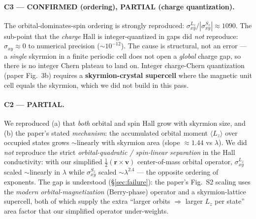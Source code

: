 \documentclass[11pt]{article}
\newcommand{\sigLz}{\sigma^{L_z}_{xy}}
\newcommand{\sigSz}{\sigma^{S_z}_{xy}}
\newcommand{\sigC}{\sigma_{xy}}
\begin{document}
\paragraph{C3 --- CONFIRMED (ordering), PARTIAL (charge quantization).}
The orbital-dominates-spin ordering is strongly reproduced: $\sigLz/|\sigSz|\approx1090$.
The sub-point that the \emph{charge} Hall is integer-quantized in gaps did \emph{not}
reproduce: $\sigC\approx0$ to numerical precision ($\sim\!10^{-12}$). The cause is
structural, not an error --- a \emph{single} skyrmion in a finite periodic cell does not
open a \emph{global} charge gap, so there is no integer Chern plateau to land on. Integer
charge-Chern quantization (paper Fig.~3b) requires a \textbf{skyrmion-crystal supercell}
where the magnetic unit cell equals the skyrmion, which we did not build in this pass.

\paragraph{C2 --- PARTIAL.}
We reproduced (a) that \emph{both} orbital and spin Hall grow with skyrmion size, and (b)
the paper's stated \emph{mechanism}: the accumulated orbital moment $\langle L_z\rangle$
over occupied states grows $\sim$linearly with skyrmion area (slope $\approx1.44$ vs
$\lambda$). We did \emph{not} reproduce the strict \emph{orbital-quadratic /
spin-linear separation} in the Hall conductivity: with our simplified $\tfrac12(\mathbf r
\times \mathbf v)$ center-of-mass orbital operator, $\sigLz$ scaled $\sim$linearly in
$\lambda$ while $\sigSz$ scaled $\sim\!\lambda^{2.4}$ --- the opposite ordering of
exponents. The gap is understood (\S\ref{sec:failure}): the paper's Fig.~S2 scaling uses
the \emph{modern orbital-magnetization} (Berry-phase) operator and a skyrmion-lattice
supercell, both of which supply the extra ``larger orbits $\Rightarrow$ larger $L_z$ per
state'' area factor that our simplified operator under-weights.
\end{document}

